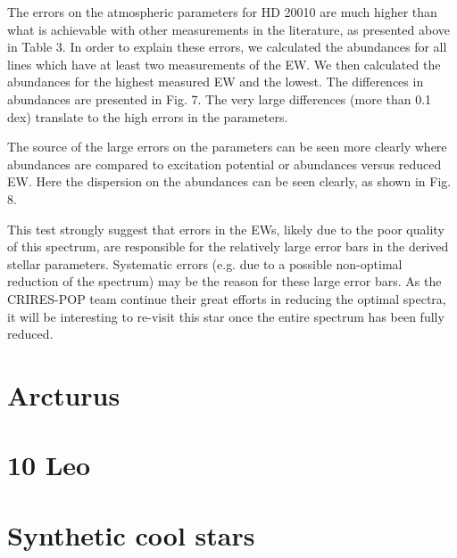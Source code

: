 The errors on the atmospheric parameters for HD 20010 are much higher than what is achievable with
other measurements in the literature, as presented above in Table 3. In order to explain these
errors, we calculated the abundances for all lines which have at least two measurements of the EW.
We then calculated the abundances for the highest measured EW and the lowest. The differences in
abundances are presented in Fig. 7. The very large differences (more than 0.1 dex) translate to the
high errors in the parameters.

The source of the large errors on the parameters can be seen more clearly where abundances are
compared to excitation potential or abundances versus reduced EW. Here the dispersion on the
abundances can be seen clearly, as shown in Fig. 8.

This test strongly suggest that errors in the EWs, likely due to the poor quality of this spectrum,
are responsible for the relatively large error bars in the derived stellar parameters. Systematic
errors (e.g. due to a possible non-optimal reduction of the spectrum) may be the reason for these
large error bars. As the CRIRES-POP team continue their great efforts in reducing the optimal
spectra, it will be interesting to re-visit this star once the entire spectrum has been fully
reduced.




\section{Arcturus}
\label{sec:arcturus}


\section{10 Leo}
\label{sec:10Leo}


\section{Synthetic cool stars}
\label{sec:synthetic_spectra}
